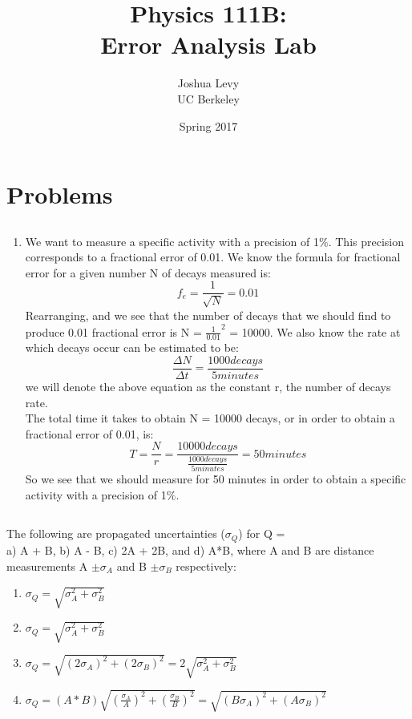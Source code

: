 \documentclass{article}
\title{Physics 111B: \\Error Analysis Lab}
\author{Joshua Levy\\UC Berkeley}
\date{Spring 2017}
\begin{document}
\maketitle

\section{Problems}
    \subsection{}
    \begin{enumerate}
        \item We want to measure a specific activity with a precision of 1$\%$. This precision corresponds to a fractional error of 0.01. We know the formula for fractional error for a given number N of decays measured is:
            \begin{equation}
                f_e = \frac{1}{\sqrt{N}} = 0.01
            \end{equation}
        Rearranging, and we see that the number of decays that we should find to produce 0.01 fractional error is N = $\frac{1}{0.01}^{2}$ = 10000. We also know the rate at which decays occur can be estimated to be:
            \begin{equation}
                \frac{\Delta N}{\Delta t} = \frac{1000 decays}{5 minutes} 
            \end{equation}
        we will denote the above equation as the constant r, the number of decays rate.\\ The total time it takes to obtain N = 10000 decays, or in order to obtain a fractional error of 0.01, is:
            \begin{equation}
                T = \frac{N}{r} = \frac{10000 decays}{\frac{1000 decays}{5 minutes}} = 50 minutes
            \end{equation}
        So we see that we should measure for 50 minutes in order to obtain a specific activity with a precision of 1$\%$.
    \end{enumerate}
    \subsection{}
    The following are propagated uncertainties ($\sigma_{Q}$) for Q = \\a) A + B, b) A - B, c) 2A + 2B, and d) A*B, where A and B are distance measurements A $\pm  \sigma_{A}$ and B $\pm  \sigma_{B}$ respectively:
        \begin{enumerate}[label = \alph*]
            \item $\sigma_{Q} = \sqrt{\sigma_{A}^2 + \sigma_{B}^2}$
            \item $\sigma_{Q} = \sqrt{\sigma_{A}^2 + \sigma_{B}^2}$
            \item $\sigma_{Q} = \sqrt{(2\sigma_{A})^2 + (2\sigma_{B})^2} = 2\sqrt{\sigma_{A}^2 + \sigma_{B}^2}$
            \item $\sigma_{Q} = (A*B)\sqrt{(\frac{\sigma_{A}}{A})^2 + (\frac{\sigma_{B}}{B})^2} = \sqrt{(B\sigma_{A})^2 + (A\sigma_{B})^2}$
        \end{enumerate}
\end{document}
